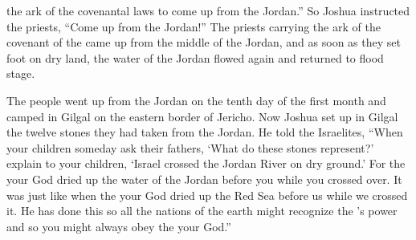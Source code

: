 {the ark
of the covenantal laws
to come up
from
the Jordan.”
So Joshua
instructed
the priests,
“Come up
from
the Jordan!”
The priests
carrying
the ark
of the covenant
of the {}
came up
from the middle
of the Jordan,
and as soon
as they
set foot
on dry land,
the water
of the Jordan
flowed again and returned
to flood stage.
\par }{\PP {}The people
went up
from
the Jordan
on the tenth
day of the first
month
and camped
in Gilgal
on the eastern
border
of Jericho.
Now Joshua
set
up in Gilgal
the twelve
stones
they
had
taken
from
the Jordan.
He told
the Israelites,
“When your children
someday
ask
their fathers,
‘What
do these
stones represent?’
explain
to your children,
‘Israel
crossed
the Jordan River
on dry ground.’
For the
{}
your God
dried
up the
water
of the Jordan
before
you while
you crossed
over. It was just
like when
the {}
your God
dried
up the Red
Sea
before
us while
we crossed it.
He has done
this so
all
the nations
of the earth
might
recognize the
{}’s
power
and so
you might always obey
the {}
your God.”

}
